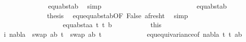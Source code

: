 \begin{isabellebody}
\ \ \ \ \ \ \ \ \ \ \ \ \ \ equ{\isacharunderscore}{\kern0pt}abst{\isacharunderscore}{\kern0pt}ab{\isacharparenleft}{\kern0pt}{}{\isacharparenright}{\kern0pt}\ \isamarkupfalse%
\ simp\isanewline
\ \ \ \ \ \ \ \ \ \ \ \ \isanewline
\ \ \ \ \ \ \ \ \ \ \ \ \isamarkupfalse%
\ {}{\isacharparenleft}{\kern0pt}{}{\isacharcomma}{\kern0pt}{}{\isacharparenright}{\kern0pt}\ equ{\isacharunderscore}{\kern0pt}abst{\isacharunderscore}{\kern0pt}ab{\isacharparenleft}{\kern0pt}{}{\isacharparenright}{\kern0pt}\ \isanewline
\ \ \ \ \ \ \ \ \ \ \ \ \isamarkupfalse%
\ {\isacharquery}{\kern0pt}thesis\ \isamarkupfalse%
\ equ{\isachardot}{\kern0pt}equ{\isacharunderscore}{\kern0pt}abst{\isacharunderscore}{\kern0pt}ab{\isacharbrackleft}{\kern0pt}OF\ False\ a{\isacharunderscore}{\kern0pt}fresh{\isacharunderscore}{\kern0pt}t{}{\isacharbrackright}{\kern0pt}\ \isamarkupfalse%
\ simp\isanewline
\ \ \ \ \ \ \ \ \ \isamarkupfalse%
\isanewline
\ \ \ \ \ \ \ \isamarkupfalse%
\isanewline
\ \ \ \ \ \ \ \ \ \isamarkupfalse%
\ {\isacharparenleft}{\kern0pt}equ{\isacharunderscore}{\kern0pt}abst{\isacharunderscore}{\kern0pt}aa\ t{}{\isacharprime}{\kern0pt}\ t{}{\isacharprime}{\kern0pt}\ b{\isacharparenright}{\kern0pt}\isanewline
\ \ \ \ \ \ \ \ \ \isamarkupfalse%
\ this{\isacharparenleft}{\kern0pt}{}{\isacharparenright}{\kern0pt}\ {}{\isacharparenleft}{\kern0pt}{}{\isacharparenright}{\kern0pt}\isanewline
\ \ \ \ \ \ \ \ \ \isamarkupfalse%
\ i{\isacharcolon}{\kern0pt}\ {\isachardoublequoteopen}nabla\ {\isasymturnstile}\ swap\ {\isacharbrackleft}{\kern0pt}{\isacharparenleft}{\kern0pt}a{\isacharcomma}{\kern0pt}b{\isacharparenright}{\kern0pt}{\isacharbrackright}{\kern0pt}\ t{}{\isacharprime}{\kern0pt}\ {\isasymapprox}\ swap\ {\isacharbrackleft}{\kern0pt}{\isacharparenleft}{\kern0pt}a{\isacharcomma}{\kern0pt}b{\isacharparenright}{\kern0pt}{\isacharbrackright}{\kern0pt}\ t{}{\isacharprime}{\kern0pt}{\isachardoublequoteclose}\isanewline
\ \ \ \ \ \ \ \ \ \ \ \isamarkupfalse%
\ equ{\isacharunderscore}{\kern0pt}equivariance{\isacharbrackleft}{\kern0pt}of\ nabla\ t{}{\isacharprime}{\kern0pt}\ t{}{\isacharprime}{\kern0pt}\ {\isacartoucheopen}{\isacharbrackleft}{\kern0pt}{\isacharparenleft}{\kern0pt}a{\isacharcomma}{\kern0pt}b{\isacharparenright}{\kern0pt}{\isacharbrackright}{\kern0pt}{\isacartoucheclose}{\isacharbrackright}{\kern0pt}\ \isamarkupfalse%

\end{isabellebody}
